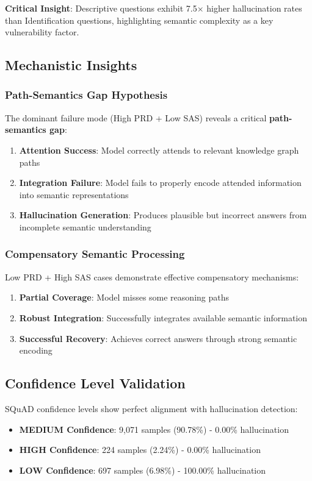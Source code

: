 \textbf{Critical Insight}: Descriptive questions exhibit 7.5$\times$ higher hallucination rates than Identification questions, highlighting semantic complexity as a key vulnerability factor.

\subsection{Mechanistic Insights}

\subsubsection{Path-Semantics Gap Hypothesis}
The dominant failure mode (High PRD + Low SAS) reveals a critical \textbf{path-semantics gap}:

\begin{enumerate}
    \item \textbf{Attention Success}: Model correctly attends to relevant knowledge graph paths
    \item \textbf{Integration Failure}: Model fails to properly encode attended information into semantic representations
    \item \textbf{Hallucination Generation}: Produces plausible but incorrect answers from incomplete semantic understanding
\end{enumerate}

\subsubsection{Compensatory Semantic Processing}
Low PRD + High SAS cases demonstrate effective compensatory mechanisms:

\begin{enumerate}
    \item \textbf{Partial Coverage}: Model misses some reasoning paths
    \item \textbf{Robust Integration}: Successfully integrates available semantic information
    \item \textbf{Successful Recovery}: Achieves correct answers through strong semantic encoding
\end{enumerate}

\subsection{Confidence Level Validation}

SQuAD confidence levels show perfect alignment with hallucination detection:
\begin{itemize}
    \item \textbf{MEDIUM Confidence}: 9,071 samples (90.78\%) - 0.00\% hallucination
    \item \textbf{HIGH Confidence}: 224 samples (2.24\%) - 0.00\% hallucination
    \item \textbf{LOW Confidence}: 697 samples (6.98\%) - 100.00\% hallucination
\end{itemize}

